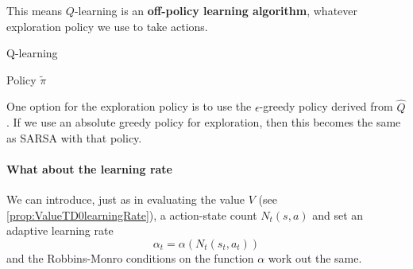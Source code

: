 \documentclass[../course-notes.tex]{subfiles}
\begin{document}
This means $Q$-learning is an \textbf{\bluefont off-policy learning algorithm}, whatever exploration policy we use to take actions.

\begin{algorithm}
	\caption{Q-learning}
	\Return Policy $\tilde{\pi}$\;
\end{algorithm}

One option for the exploration policy is to use the $\epsilon$-greedy policy derived from $\widehat{Q}$. If we use an absolute greedy policy for exploration, then this becomes the same as SARSA with that policy.



\paragraph{What about the learning rate} We can introduce, just as in evaluating the value $V$ (see \cref{prop:ValueTD0learningRate}), a action-state count $N_t(s,a)$ and set an adaptive learning rate
\[
	\alpha_t = \alpha(N_t(s_t, a_t))
\]
and the Robbins-Monro conditions on the function $\alpha$ work out the same.
\end{document}
